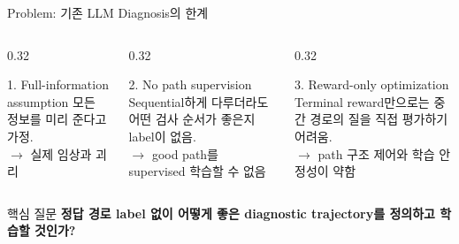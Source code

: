 \documentclass[11pt,notheorems,hyperref={pdfauthor=whatever}]{beamer}
\begin{document}
\begin{frame}[t]{Problem: 기존 LLM Diagnosis의 한계}
\small
\begin{columns}[T,onlytextwidth]
\begin{column}{0.32\textwidth}
\begin{block}{1. Full-information assumption}
\footnotesize
모든 정보를 미리 준다고 가정.\\[0.35em]
\textbf{\(\rightarrow\)} 실제 임상과 괴리
\end{block}
\end{column}
\begin{column}{0.32\textwidth}
\begin{block}{2. No path supervision}
\footnotesize
Sequential하게 다루더라도 어떤 검사 순서가 좋은지 label이 없음.\\[0.35em]
\textbf{\(\rightarrow\)} good path를 supervised 학습할 수 없음
\end{block}
\end{column}
\begin{column}{0.32\textwidth}
\begin{block}{3. Reward-only optimization}
\footnotesize
Terminal reward만으로는 중간 경로의 질을 직접 평가하기 어려움.\\[0.35em]
\textbf{\(\rightarrow\)} path 구조 제어와 학습 안정성이 약함
\end{block}
\end{column}
\end{columns}
\vspace{0.75em}
\begin{block}{핵심 질문}
\centering\small\bfseries
정답 경로 label 없이 어떻게 좋은 diagnostic trajectory를 정의하고 학습할 것인가?
\end{block}
\end{frame}
\end{document}
